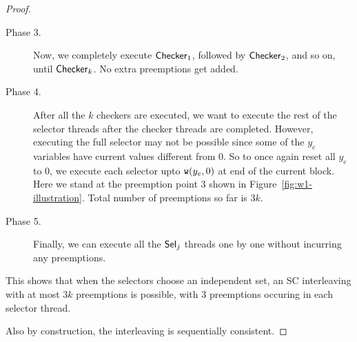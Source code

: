 \begin{proof}
\begin{description}
\item[Phase 3.] Now, we completely execute $\mathsf{Checker}_1$, followed by $\mathsf{Checker}_2$, and so on, until $\mathsf{Checker}_k$. No extra preemptions get added. 
\item[Phase 4.] After all the $k$ checkers are executed, we want to execute the rest of the selector threads after the checker threads are completed. However, executing the full selector may not be possible since some of the $y_e$ variables have current values different from $0$. So to once again reset all $y_e$ to $0$, we execute each selector upto $\mathtt{w}(y_e, 0)$ at end of the current block. Here we stand at the preemption point $3$ shown in Figure~\ref{fig:w1-illustration}. Total number of preemptions so far is $3k$.

\item[Phase 5. ] Finally, we can execute all the $\mathsf{Sel}_j$ threads one by one without incurring any preemptions. 
\end{description} 

This shows that when the selectors choose an independent set, an SC interleaving with at most $3k$ preemptions is possible, with $3$ preemptions occuring in each selector thread.

Also by construction, the interleaving is sequentially consistent. 
\end{proof}

